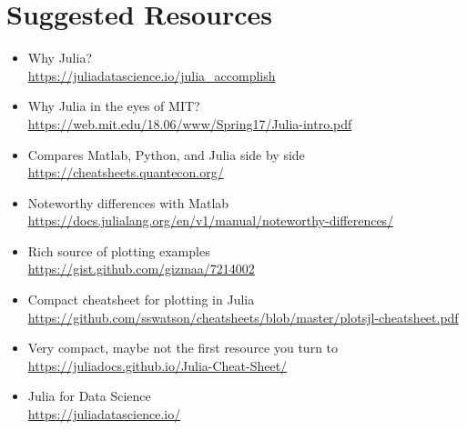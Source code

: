 







\section{Suggested Resources}

\begin{itemize}
\item Why Julia? \\ \url{https://juliadatascience.io/julia_accomplish}
    \item Why Julia in the eyes of MIT? \\ \url{https://web.mit.edu/18.06/www/Spring17/Julia-intro.pdf}
    \item Compares Matlab, Python, and Julia side by side\\ \url{https://cheatsheets.quantecon.org/}
    \item Noteworthy differences with Matlab \\ \url{https://docs.julialang.org/en/v1/manual/noteworthy-differences/}
    \item Rich source of plotting examples \\ \url{https://gist.github.com/gizmaa/7214002}
    \item Compact cheatsheet for plotting in Julia\\ \url{https://github.com/sswatson/cheatsheets/blob/master/plotsjl-cheatsheet.pdf}
    \item Very compact, maybe not the first resource you turn to \\ \url{https://juliadocs.github.io/Julia-Cheat-Sheet/}
    \item Julia for Data Science \\ \url{https://juliadatascience.io/}
\end{itemize}